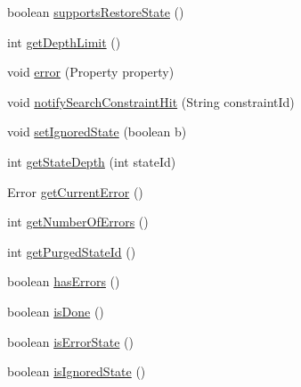 \begin{DoxyCompactItemize}
\item 
boolean \hyperlink{classgov_1_1nasa_1_1jpf_1_1inspector_1_1server_1_1jpf_1_1_search_wrapper_a3d2e273c4c67c751b317f0a5f900eaed}{supports\+Restore\+State} ()
\item 
int \hyperlink{classgov_1_1nasa_1_1jpf_1_1inspector_1_1server_1_1jpf_1_1_search_wrapper_a8c8813daa43bb530cead43a6ca4e0c60}{get\+Depth\+Limit} ()
\item 
void \hyperlink{classgov_1_1nasa_1_1jpf_1_1inspector_1_1server_1_1jpf_1_1_search_wrapper_a62f182664b61ec7d32e677a96485f217}{error} (Property property)
\item 
void \hyperlink{classgov_1_1nasa_1_1jpf_1_1inspector_1_1server_1_1jpf_1_1_search_wrapper_a19e9d5eaf8429964efe0174c60136eee}{notify\+Search\+Constraint\+Hit} (String constraint\+Id)
\item 
void \hyperlink{classgov_1_1nasa_1_1jpf_1_1inspector_1_1server_1_1jpf_1_1_search_wrapper_a2dc3c4426abb3b54cc8517dad86f86a1}{set\+Ignored\+State} (boolean b)
\item 
int \hyperlink{classgov_1_1nasa_1_1jpf_1_1inspector_1_1server_1_1jpf_1_1_search_wrapper_a52dc09b90bb690fec56ab3ed2eb48b94}{get\+State\+Depth} (int state\+Id)
\item 
Error \hyperlink{classgov_1_1nasa_1_1jpf_1_1inspector_1_1server_1_1jpf_1_1_search_wrapper_af2a205971aa2b3d5948853b1cde12bb7}{get\+Current\+Error} ()
\item 
int \hyperlink{classgov_1_1nasa_1_1jpf_1_1inspector_1_1server_1_1jpf_1_1_search_wrapper_a1391ed9b29ead20a41bb31b2a0b0fa8f}{get\+Number\+Of\+Errors} ()
\item 
int \hyperlink{classgov_1_1nasa_1_1jpf_1_1inspector_1_1server_1_1jpf_1_1_search_wrapper_a53318a48ed72df8d8d6062e41da3cc1f}{get\+Purged\+State\+Id} ()
\item 
boolean \hyperlink{classgov_1_1nasa_1_1jpf_1_1inspector_1_1server_1_1jpf_1_1_search_wrapper_a09f50a7695e09a23fd0deba3093b6d9d}{has\+Errors} ()
\item 
boolean \hyperlink{classgov_1_1nasa_1_1jpf_1_1inspector_1_1server_1_1jpf_1_1_search_wrapper_af721ef9ddb26dcad18338dc4f3711bfc}{is\+Done} ()
\item 
boolean \hyperlink{classgov_1_1nasa_1_1jpf_1_1inspector_1_1server_1_1jpf_1_1_search_wrapper_a456036655258920c10510e4707d47dd8}{is\+Error\+State} ()
\item 
boolean \hyperlink{classgov_1_1nasa_1_1jpf_1_1inspector_1_1server_1_1jpf_1_1_search_wrapper_aaefdd67e29d7dbd7798499b2d63a39ec}{is\+Ignored\+State} ()
\item 

\end{DoxyCompactItemize}
